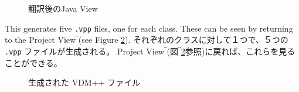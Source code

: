 \documentclass[\pformat,12pt]{jarticle}
\newcommand{\guicmd}[1]{{\sf #1}}
\begin{document}
\begin{figure}[tbh]
\begin{center}
\caption{翻訳後のJava View}\label{fig:translationDone}
\end{center}
\end{figure}

This generates five {\tt .vpp} files, one for each class. These can be
seen by returning to the \guicmd{Project View}‾(see
Figure‾\ref{fig:vdmFiles}). 
それぞれのクラスに対して１つで、５つの {\tt .vpp} ファイルが生成される。
 \guicmd{Project View}‾(図‾\ref{fig:vdmFiles}参照)に戻れば、これらを見ることができる。

\begin{figure}[tbh]
\begin{center}
\caption{生成された VDM++ ファイル}\label{fig:vdmFiles}
\end{center}
\end{figure}
\end{document}
